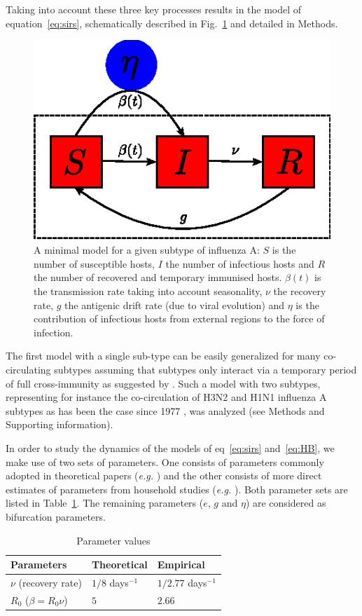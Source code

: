 Taking into account these three key processes results in the model of
equation~\eqref{eq:sirs}, schematically described in
Fig.~\ref{fig:sirs} and detailed in Methods.

\begin{figure}[htbp]
  \center
  \includegraphics[width= 0.3 \linewidth]{texte/article2/graph/sirs.eps}
  \caption{A minimal model for a given subtype of influenza A: $S$ is
    the number of susceptible hosts, $I$ the number of infectious
    hosts and $R$ the number of recovered and temporary immunised
    hosts. $\beta(t)$ is the transmission rate taking into account
    seasonality, $\nu$ the recovery rate, $g$ the antigenic drift rate
    (due to viral evolution) and $\eta$ is the contribution of
    infectious hosts from external regions to the force of infection.}
  \label{fig:sirs}
\end{figure}

The first model with a single sub-type can be easily generalized for
many co-circulating subtypes assuming that subtypes only interact via
a temporary period of full cross-immunity as suggested by
\citet{Webster1992}.  Such a model with two subtypes, representing for
instance the co-circulation of H3N2 and H1N1 influenza A subtypes as
has been the case since 1977 \citep{Earn2002}, was analyzed (see
Methods and Supporting information).

In order to study the dynamics of the models of eq~\eqref{eq:sirs}
and~\eqref{eq:HB}, we make use of two sets of parameters. One consists
of parameters commonly adopted in theoretical papers (\textit{e.g.}
\citet{Koelle2006, Ferguson2003, Goekaydin2007}) and the other
consists of more direct estimates of parameters from household studies
(\textit{e.g.} \citet{Cauchemez2004, Lavenu2004}). Both parameter sets
are listed in Table~\ref{tab:param}.  The remaining parameters ($e$,
$g$ and $\eta$) are considered as bifurcation parameters.

\begin{table}[htb]
  \center
  \begin{tabular}{|l|l|l|}
    \hline
    Parameters & Theoretical & Empirical\\
    \hline
    $\nu$ (recovery rate) & $1/8$ days$^{-1}$ \citep{Koelle2006} & $1/2.77$ days$^{-1}$ \citep{Lavenu2004} \\
    \hline	
    $R_0$ ($\beta=R_0 \nu$) & $5$ \citep{Koelle2006} & $2.66$ \citep{Lavenu2004} \\
    \hline		
  \end{tabular}
  \caption{Parameter values}
  \label{tab:param}
\end{table}

